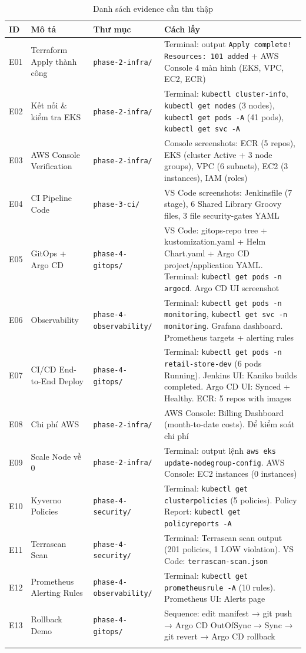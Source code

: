 \documentclass[13pt,a4paper,twoside]{extarticle}
\begin{document}
\begin{longtable}{@{}p{0.8cm} p{4cm} p{3.5cm} p{5.5cm}@{}}
\toprule
\textbf{ID} & \textbf{Mô tả} & \textbf{Thư mục} & \textbf{Cách lấy} \\
\midrule
E01 & Terraform Apply thành công & \texttt{phase-2-infra/} & Terminal: output \texttt{Apply complete! Resources: 101 added} + AWS Console 4 màn hình (EKS, VPC, EC2, ECR) \\
\midrule
E02 & Kết nối \& kiểm tra EKS & \texttt{phase-2-infra/} & Terminal: \texttt{kubectl cluster-info}, \texttt{kubectl get nodes} (3 nodes), \texttt{kubectl get pods -A} (41 pods), \texttt{kubectl get svc -A} \\
\midrule
E03 & AWS Console Verification & \texttt{phase-2-infra/} & Console screenshots: ECR (5 repos), EKS (cluster Active + 3 node groups), VPC (6 subnets), EC2 (3 instances), IAM (roles) \\
\midrule
E04 & CI Pipeline Code & \texttt{phase-3-ci/} & VS Code screenshots: Jenkinsfile (7 stage), 6 Shared Library Groovy files, 3 file security-gates YAML \\
\midrule
E05 & GitOps + Argo CD & \texttt{phase-4-gitops/} & VS Code: gitops-repo tree + kustomization.yaml + Helm Chart.yaml + Argo CD project/application YAML. Terminal: \texttt{kubectl get pods -n argocd}. Argo CD UI screenshot \\
\midrule
E06 & Observability & \texttt{phase-4-observability/} & Terminal: \texttt{kubectl get pods -n monitoring}, \texttt{kubectl get svc -n monitoring}. Grafana dashboard. Prometheus targets + alerting rules \\
\midrule
E07 & CI/CD End-to-End Deploy & \texttt{phase-4-gitops/} & Terminal: \texttt{kubectl get pods -n retail-store-dev} (6 pods Running). Jenkins UI: Kaniko builds completed. Argo CD UI: Synced + Healthy. ECR: 5 repos with images \\
\midrule
E08 & Chi phí AWS & \texttt{phase-2-infra/} & AWS Console: Billing Dashboard (month-to-date costs). Để kiểm soát chi phí \\
\midrule
E09 & Scale Node về 0 & \texttt{phase-2-infra/} & Terminal: output lệnh \texttt{aws eks update-nodegroup-config}. AWS Console: EC2 instances (0 instances) \\
\midrule
E10 & Kyverno Policies & \texttt{phase-4-security/} & Terminal: \texttt{kubectl get clusterpolicies} (5 policies). Policy Report: \texttt{kubectl get policyreports -A} \\
\midrule
E11 & Terrascan Scan & \texttt{phase-4-security/} & Terminal: Terrascan scan output (201 policies, 1 LOW violation). VS Code: \texttt{terrascan-scan.json} \\
\midrule
E12 & Prometheus Alerting Rules & \texttt{phase-4-observability/} & Terminal: \texttt{kubectl get prometheusrule -A} (10 rules). Prometheus UI: Alerts page \\
\midrule
E13 & Rollback Demo & \texttt{phase-4-gitops/} & Sequence: edit manifest → git push → Argo CD OutOfSync → Sync → git revert → Argo CD rollback \\
\bottomrule
\caption{Danh sách evidence cần thu thập}
\label{tab:evidence-checklist}
\end{longtable}
\end{document}
